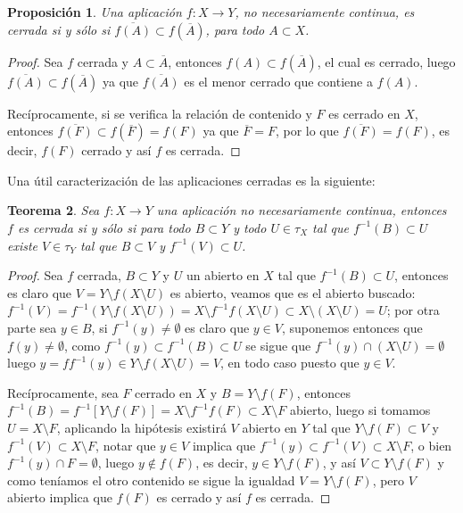 \documentclass[12pt]{article}
\newtheorem{theorem}{Teorema}[section]
\newtheorem{proposition}[theorem]{Proposición}
\begin{document}
\begin{proposition}Una aplicación $f \colon X \longrightarrow Y$, no necesariamente continua, es cerrada si y sólo si $\overline{f(A)} \subset f(\overline{A})$, para todo $A \subset X$.
\end{proposition}
\begin{proof}
Sea $f$ cerrada y $A \subset \overline{A}$, entonces $f(A) \subset f(\overline{A})$, el cual es cerrado, luego $\overline{f(A)} \subset f(\overline{A})$ ya que $\overline{f(A)}$ es el menor cerrado que contiene a $f(A)$.

Recíprocamente, si se verifica la relación de contenido y $F$ es cerrado en $X$, entonces $\overline{f(F)} \subset f(\overline{F}) = f(F)$ ya que $\overline{F} = F$, por lo que $\overline{f(F)} = f(F)$, es decir, $f(F)$ cerrado y así $f$ es cerrada.

\end{proof}

Una útil caracterización de las aplicaciones cerradas es la siguiente: 

\begin{theorem}
Sea $f \colon X \longrightarrow Y$ una aplicación no necesariamente continua, entonces $f$ es cerrada si y sólo si para todo $B \subset Y$ y todo $U \in \tau_X$ tal que $f^{-1}(B) \subset U$ existe $V \in \tau_Y$ tal que $B \subset V$ y $f^{-1}(V) \subset U$.
\end{theorem}
\begin{proof}
Sea $f$ cerrada, $B \subset Y$ y $U$ un abierto en $X$ tal que $f^{-1}(B) \subset U$, entonces es claro que $V = Y \setminus f(X\setminus U)$ es abierto, veamos que es el abierto buscado: $f^{-1}(V) = f^{-1}(Y \setminus f(X\setminus U)) = X \setminus f^{-1}f(X\setminus U) \subset X \setminus (X \setminus U) = U$; por otra parte sea $y \in B$, si $f^{-1}(y) \neq \emptyset$ es claro que $y \in V$, suponemos entonces que $f(y) \neq \emptyset$, como $f^{-1}(y) \subset f^{-1}(B) \subset U$ se sigue que $f^{-1}(y) \cap (X \setminus U) = \emptyset$ luego $y= ff^{-1}(y) \in Y \setminus f(X \setminus U) = V$, en todo caso puesto que $y \in V$.

Recíprocamente, sea $F$ cerrado en $X$ y $B = Y \setminus f(F)$, entonces $f^{-1}(B) = f^{-1}[Y \setminus f(F)] = X \setminus f^{-1}f(F) \subset X \setminus F$ abierto, luego si tomamos $U = X \setminus F$, aplicando la hipótesis existirá $V$ abierto en $Y$ tal que $Y \setminus f(F) \subset V$ y $f^{-1}(V) \subset X \setminus F$, notar que $y \in V$ implica que $f^{-1}(y) \subset f^{-1}(V) \subset X \setminus F$, o bien $f^{-1}(y)\cap F = \emptyset$, luego $y \notin f(F)$, es decir,  $y \in Y \setminus f(F)$, y así $V \subset Y \setminus f(F)$ y como teníamos el otro contenido se sigue la igualdad $V = Y \setminus f(F)$, pero $V$ abierto implica que $f(F)$ es cerrado y así $f$ es cerrada.

\end{proof}
\end{document}
